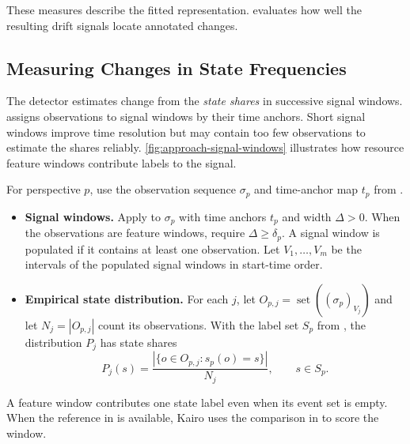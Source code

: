 These measures describe the fitted representation.  evaluates how well the resulting drift signals locate annotated changes.

\subsection{Measuring Changes in State Frequencies}\label{sec:approach-signal}

The detector estimates change from the \emph{state shares} in successive signal windows.  assigns observations to signal windows by their time anchors. Short signal windows improve time resolution but may contain too few observations to estimate the shares reliably. \autoref{fig:approach-signal-windows} illustrates how resource feature windows contribute labels to the signal.

\begin{Definition}\label{def:state-distributions}
For perspective $p$, use the observation sequence $\sigma_p$ and time-anchor map $t_p$ from .
\begin{itemize}
  \item \textbf{Signal windows.} Apply  to $\sigma_p$ with time anchors $t_p$ and width $\Delta>0$. When the observations are feature windows, require $\Delta\geq\delta_p$. A signal window is populated if it contains at least one observation. Let $V_1,\ldots,V_m$ be the intervals of the populated signal windows in start-time order.
  \item \textbf{Empirical state distribution.} For each $j$, let $O_{p,j}=\operatorname{set}((\sigma_p)_{V_j})$ and let $N_j=|O_{p,j}|$ count its observations. With the label set $S_p$ from , the distribution $P_j$ has state shares
  \[
     P_j(s)=\frac{|\{o\in O_{p,j}:s_p(o)=s\}|}{N_j},
     \qquad s\in S_p.
  \]
\end{itemize}
\end{Definition}

A feature window contributes one state label even when its event set is empty. When the reference in  is available, Kairo uses the comparison in  to score the window.

